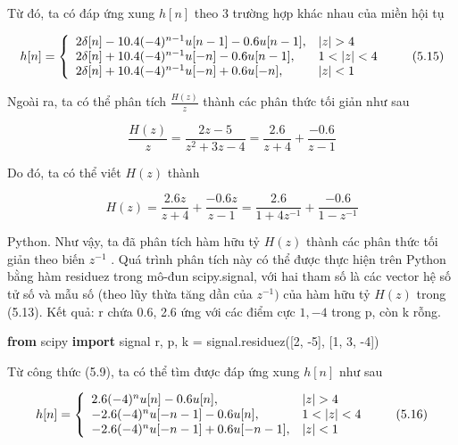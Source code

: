 \documentclass[
  10
]{article}
\newenvironment{Shaded}{}{}
\newcommand{\DecValTok}[1]{\textcolor[rgb]{0.25,0.63,0.44}{#1}}
\newcommand{\ImportTok}[1]{\textcolor[rgb]{0.00,0.50,0.00}{\textbf{#1}}}
\newcommand{\NormalTok}[1]{#1}
\newcommand{\OperatorTok}[1]{\textcolor[rgb]{0.40,0.40,0.40}{#1}}
\begin{document}
Từ đó, ta có đáp ứng xung \(h [ n ]\) theo 3 trường hợp khác nhau của
miền hội tụ

\[
h [ n ] = \left\{ \begin{array}{l l} 2 \delta [ n ] - 1 0. 4 (- 4) ^ {n - 1} u [ n - 1 ] - 0. 6 u [ n - 1 ], & | z | > 4 \\ 2 \delta [ n ] + 1 0. 4 (- 4) ^ {n - 1} u [ - n ] - 0. 6 u [ n - 1 ], & 1 <   | z | <   4 \\ 2 \delta [ n ] + 1 0. 4 (- 4) ^ {n - 1} u [ - n ] + 0. 6 u [ - n ], & | z | <   1 \end{array} \right.\tag{5.15}
\]

Ngoài ra, ta có thể phân tích \(\textstyle { \frac { H ( z ) } { z } }\)
thành các phân thức tối giản như sau

\[
{\frac {H (z)}{z}} = {\frac {2 z - 5}{z ^ {2} + 3 z - 4}} = {\frac {2 . 6}{z + 4}} + {\frac {- 0 . 6}{z - 1}}
\]

Do đó, ta có thể viết \(H ( z )\) thành

\[
H (z) = \frac {2 . 6 z}{z + 4} + \frac {- 0 . 6 z}{z - 1} = \frac {2 . 6}{1 + 4 z ^ {- 1}} + \frac {- 0 . 6}{1 - z ^ {- 1}}
\]

Python. Như vậy, ta đã phân tích hàm hữu tỷ \(H ( z )\) thành các phân
thức tối giản theo biến \(z ^ { - 1 }\) . Quá trình phân tích này có thể
được thực hiện trên Python bằng hàm residuez trong mô-đun scipy.signal,
với hai tham số là các vector hệ số tử số và mẫu số (theo lũy thừa tăng
dần của \(z ^ { - 1 } )\) của hàm hữu tỷ \(H ( z )\) trong (5.13). Kết
quả: r chứa 0.6, 2.6 ứng với các điểm cực \(1 , - 4\) trong p, còn k
rỗng.

\begin{Shaded}
\begin{Highlighting}[]
\ImportTok{from}\NormalTok{ scipy }\ImportTok{import}\NormalTok{ signal}
\NormalTok{r, p, k }\OperatorTok{=}\NormalTok{ signal.residuez([}\DecValTok{2}\NormalTok{, }\OperatorTok{{-}}\DecValTok{5}\NormalTok{], [}\DecValTok{1}\NormalTok{, }\DecValTok{3}\NormalTok{, }\OperatorTok{{-}}\DecValTok{4}\NormalTok{]) }
\end{Highlighting}
\end{Shaded}

Từ công thức (5.9), ta có thể tìm được đáp ứng xung \(h [ n ]\) như sau

\[
h [ n ] = \left\{ \begin{array}{l l} 2. 6 (- 4) ^ {n} u [ n ] - 0. 6 u [ n ], & | z | > 4 \\ - 2. 6 (- 4) ^ {n} u [ - n - 1 ] - 0. 6 u [ n ], & 1 <   | z | <   4 \\ - 2. 6 (- 4) ^ {n} u [ - n - 1 ] + 0. 6 u [ - n - 1 ], & | z | <   1 \end{array} \right.\tag{5.16}
\]
\end{document}
